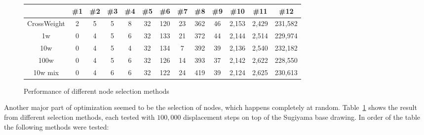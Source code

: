 \documentclass[]{llncs}
\begin{document}
\begin{figure}
\centering
\begin{tabular}{|c|c|c|c|c|c|c|c|c|c|c|c|c|}
	\hline 
	& \#1 & \#2 & \#3 & \#4 & \#5 & \#6 & \#7 & \#8 & \#9 & \#10 & \#11 & \#12 \\
	\hline 
	CrossWeight & 2 & 5 & 5 & 8 & 32 & 120 & 23 & 362 & 46 & 2,153 & 2,429 & 231,582 \\
	\hline
	1w & 0 & 4 & 5 & 6 & 32 & 133 & 21 & 372 & 44 & 2,144 & 2,514 & 229,974 \\
	\hline
	10w & 0 & 4 & 5 & 4 & 32 & 134 & 7 & 392 & 39 & 2,136 & 2,540 & 232,182 \\
	\hline
	100w & 0 & 4 & 5 & 6 & 32 & 126 & 14 & 393 & 37 & 2,142 & 2,622 & 228,550 \\
	\hline
	10w mix & 0 & 4 & 6 & 6 & 32 & 122 & 24 & 419 & 39 & 2,124 & 2,625 & 230,613 \\
	\hline
\end{tabular}
\caption{Performance of different node selection methods}
\label{select-res}
\end{figure}
	Another major part of optimization seemed to be the selection of nodes, which happens completely at random. Table~\ref{select-res} shows the result from different selection methods, each tested with $100,000$ displacement steps on top of the Sugiyama base drawing. In order of the table the following methods were tested:
\end{document}
